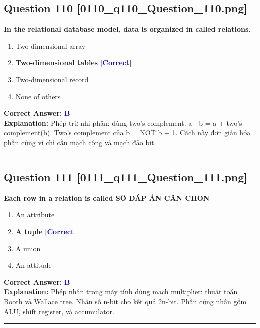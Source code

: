 \documentclass[11pt,a4paper]{article}
\begin{document}
\begin{minipage}{\textwidth}
\subsection*{Question 110 \quad \footnotesize{[0110\_q110\_Question\_110.png]}}
\noindent \textbf{In the relational database model, data is organized in called relations.}

\begin{enumerate}[label=\Alph*.]
    \item Two-dimensional array
    \item \textbf{Two-dimensional tables} \hfill \textcolor{blue}{\textbf{[Correct]}}
    \item Two-dimensional record
    \item None of others
\end{enumerate}

\noindent \textbf{Correct Answer:} \textcolor{blue}{\textbf{B}} \\[2pt]
\noindent \textbf{Explanation:} Phép trừ nhị phân: dùng two's complement. a - b = a + two's complement(b). Two's complement của b = NOT b + 1. Cách này đơn giản hóa phần cứng vì chỉ cần mạch cộng và mạch đảo bit.

\par\vspace{0.3cm}
\hrule
\vspace{0.3cm}
\end{minipage}

\begin{minipage}{\textwidth}
\subsection*{Question 111 \quad \footnotesize{[0111\_q111\_Question\_111.png]}}
\noindent \textbf{Each row in a relation is called SÖ DÁP ÁN CÃN CHON}

\begin{enumerate}[label=\Alph*.]
    \item An attribute
    \item \textbf{A tuple} \hfill \textcolor{blue}{\textbf{[Correct]}}
    \item A union
    \item An attitude
\end{enumerate}

\noindent \textbf{Correct Answer:} \textcolor{blue}{\textbf{B}} \\[2pt]
\noindent \textbf{Explanation:} Phép nhân trong máy tính dùng mạch multiplier: thuật toán Booth và Wallace tree. Nhân số n-bit cho kết quả 2n-bit. Phần cứng nhân gồm ALU, shift register, và accumulator.

\par\vspace{0.3cm}
\hrule
\vspace{0.3cm}
\end{minipage}
\end{document}

